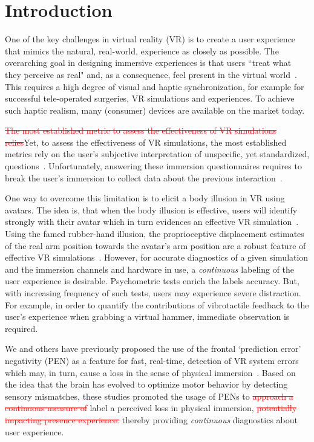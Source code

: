 \section{Introduction} 

One of the key challenges in virtual reality (VR) is to create a user experience that mimics the natural, real-world, experience as closely as possible. The overarching goal in \textcolor{n}{designing} immersive experiences is that users ``treat what they perceive as real" and, as a consequence, feel present in the virtual world~\cite{Slater2009-au}. This requires a high degree of visual and haptic synchronization, for example for successful tele-operated surgeries, VR simulations and experiences. \textcolor{n}{To achieve such haptic realism, many (consumer) devices are available on the market today.}

\textcolor{red}{\st{The most established metric to assess the effectiveness of VR simulations relies}}\textcolor{n}{Yet, to assess the effectiveness of VR simulations, the most established metrics rely on the user’s subjective interpretation of unspecific, yet standardized, questions~\cite{Schubert2003-sq, Witmer1998-ew}.} Unfortunately, answering these immersion questionnaires requires to break the user’s immersion to collect data about the previous interaction~\cite{Slater1999-dm}.

\textcolor{n}{One way to overcome this limitation is to elicit a body illusion in VR using avatars. The idea is, that when the body illusion is effective, users will identify strongly with their avatar which in turn evidences an effective VR simulation~\cite{Kilteni2012-gm}. Using the famed rubber-hand illusion, the proprioceptive displacement estimates of the real arm position towards the avatar's arm position are a robust feature of effective VR simulations~\cite{Sanchez-Vives2010-mg}}. 
\textcolor{n}{However, for accurate diagnostics of a given simulation and the immersion channels and hardware in use, a \textit{continuous} labeling of the user experience is desirable. Psychometric tests enrich the labels accuracy. But, with increasing frequency of such tests, users may experience severe distraction. For example, in order to quantify the contributions of vibrotactile feedback to the user's experience when grabbing a virtual hammer, immediate observation is required.}

We and others have previously proposed the use of the frontal `prediction error' negativity (PEN) as a feature for fast, real-time, detection of VR system errors which may, in turn, cause a loss in the sense of physical immersion~\cite{Gehrke2019-og, Si-mohammed2020-ru, Singh2018-qi}. Based on the idea that the brain has evolved to optimize motor behavior by detecting sensory mismatches, these studies promoted the usage of PENs to \textcolor{red}{\st{approach a continuous measure of}} \textcolor{n}{label} a perceived loss in physical immersion, \textcolor{red}{\st{potentially impacting presence experience.}} \textcolor{n}{thereby providing \textit{continuous} diagnostics about user experience.}

